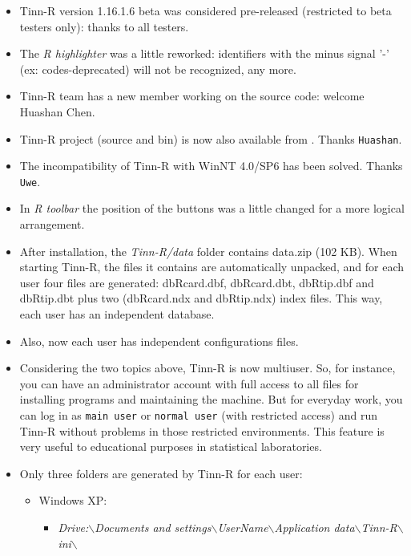 \begin{itemize}
  \item Tinn-R version 1.16.1.6 beta was considered pre-released
    (restricted to beta testers only): thanks to all testers.
  \item The \textit{R highlighter} was a little reworked: identifiers
    with the minus signal '-' (ex: codes-deprecated) will not be
    recognized, any more.
  \item Tinn-R team has a new member working on the source code:
    welcome Huashan Chen.
  \item Tinn-R project (source and bin) is now also available from
    .
    Thanks \texttt{Huashan}.
  \item The incompatibility of Tinn-R with WinNT 4.0/SP6 has been solved.
    Thanks \texttt{Uwe}.
  \item In \textit{R toolbar} the position of the buttons was a little changed
    for a more logical arrangement.
  \item After installation, the \textit{Tinn-R/data} folder contains
    data.zip (102 KB). When starting Tinn-R, the files it contains
    are automatically unpacked, and for each user four files
    are generated: dbRcard.dbf, dbRcard.dbt, dbRtip.dbf and dbRtip.dbt
    plus two (dbRcard.ndx and dbRtip.ndx) index files. This way, each
    user has an independent database.
  \item Also, now each user has independent configurations files.
  \item Considering the two topics above, Tinn-R is now multiuser. So,
    for instance, you can have an administrator account with full access
    to all files for installing programs and maintaining the machine.
    But for everyday work, you can log in as \texttt{main user} or
    \texttt{normal user} (with restricted access) and run Tinn-R
    without problems in those restricted environments. This feature
    is very useful to educational purposes in statistical laboratories.
  \item Only three folders are generated by Tinn-R for each user:
    \begin{itemize}
      \item Windows XP:
        \begin{footnotesize}
          \begin{itemize}
            \item \textit{Drive:$\backslash$Documents and settings$\backslash$UserName$\backslash$Application data$\backslash$Tinn-R$\backslash$ini$\backslash$}

\end{itemize}
\end{footnotesize}
\end{itemize}
\end{itemize}
